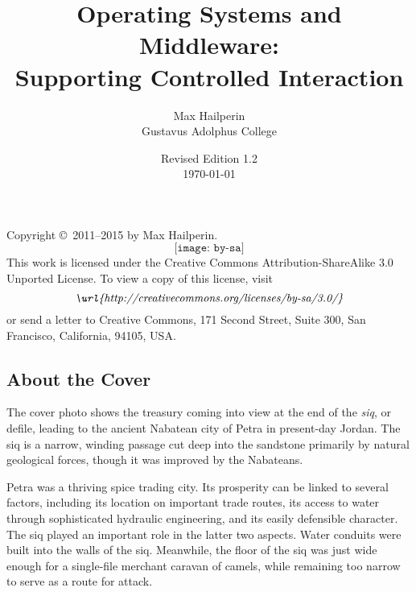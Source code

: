 \documentclass[11pt]{book}
\title{Operating Systems and Middleware:\\Supporting Controlled Interaction}
\author{Max Hailperin\\Gustavus Adolphus College}
\date{Revised Edition 1.2\\\today}
\begin{document}

\frontmatter
\iffancytitlepage
{}
\makeatletter
{}%
\makeatother
\else
\maketitle
\fi

\clearpage\thispagestyle{empty}
\noindent Copyright \copyright\ 2011--2015 by Max Hailperin.
\[\texttt{[image: by-sa]}\]
This work is licensed under the Creative Commons Attribution-ShareAlike 3.0 Unported License. To view a copy of this
license, visit
\[ \textit{\url{http://creativecommons.org/licenses/by-sa/3.0/}} \]
or send a letter to Creative Commons, 171 Second Street,
Suite 300, San Francisco, California, 94105, USA.
\iffancytitlepage
\subsection*{About the Cover}
The cover photo shows the treasury coming into view at the end of the \textit{siq}, or defile, leading to the ancient Nabatean city of Petra in present-day Jordan. The siq is a narrow, winding passage cut deep into the sandstone primarily by natural geological forces, though it was improved by the Nabateans.

Petra was a thriving spice trading city. Its prosperity can be linked to several factors, including its location on important trade routes, its access to water through sophisticated hydraulic engineering, and its easily defensible character. The siq played an important role in the latter two aspects. Water conduits were built into the walls of the siq. Meanwhile, the floor of the siq was just wide enough for a single-file merchant caravan of camels, while remaining too narrow to serve as a route for attack.
\end{document}
